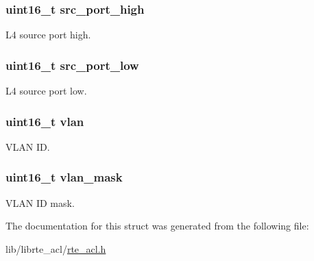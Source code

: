 \subsubsection[{src\+\_\+port\+\_\+high}]{\setlength{\rightskip}{0pt plus 5cm}uint16\+\_\+t src\+\_\+port\+\_\+high}\label{structrte__acl__ipv4vlan__rule_aa63ab325626a166191911278c308b65a}
L4 source port high. \hypertarget{structrte__acl__ipv4vlan__rule_a0331a6c2640bae85f6cc6d5871159fb7}{}
\subsubsection[{src\+\_\+port\+\_\+low}]{\setlength{\rightskip}{0pt plus 5cm}uint16\+\_\+t src\+\_\+port\+\_\+low}\label{structrte__acl__ipv4vlan__rule_a0331a6c2640bae85f6cc6d5871159fb7}
L4 source port low. \hypertarget{structrte__acl__ipv4vlan__rule_a92937e69e9229d22ff399ab3dc050fd2}{}
\subsubsection[{vlan}]{\setlength{\rightskip}{0pt plus 5cm}uint16\+\_\+t vlan}\label{structrte__acl__ipv4vlan__rule_a92937e69e9229d22ff399ab3dc050fd2}
V\+L\+A\+N I\+D. \hypertarget{structrte__acl__ipv4vlan__rule_a98c97ee3f299909e11bafad60ea53215}{}
\subsubsection[{vlan\+\_\+mask}]{\setlength{\rightskip}{0pt plus 5cm}uint16\+\_\+t vlan\+\_\+mask}\label{structrte__acl__ipv4vlan__rule_a98c97ee3f299909e11bafad60ea53215}
V\+L\+A\+N I\+D mask. 

The documentation for this struct was generated from the following file\+:\begin{DoxyCompactItemize}
\item 
lib/librte\+\_\+acl/\hyperlink{rte__acl_8h}{rte\+\_\+acl.\+h}\end{DoxyCompactItemize}
